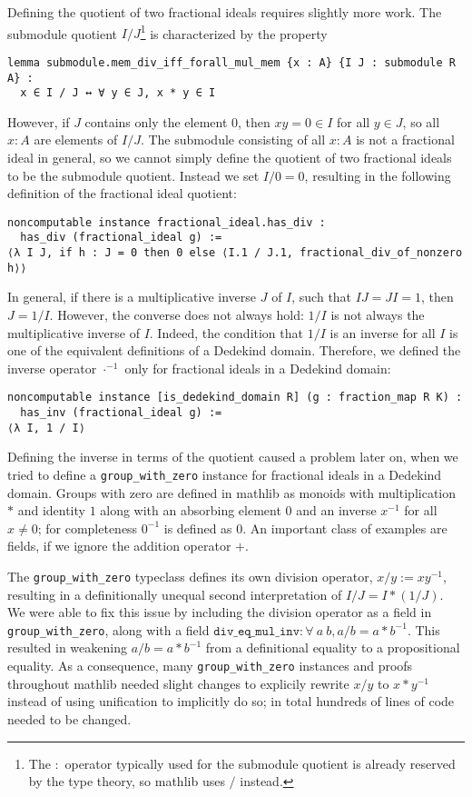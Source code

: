 \documentclass[a4paper,USenglish,cleveref, autoref, thm-restate]{lipics-v2021}
\newcommand{\lean}[1]{\texttt{#1}\xspace} %
\newcommand{\mathlib}{\textsf{mathlib}\xspace}
\begin{document}
Defining the quotient of two fractional ideals requires slightly more work.
The submodule quotient $I / J$\footnote{The $:$ operator typically used for the submodule quotient is already reserved by the type theory, so \mathlib uses $/$ instead.} is characterized by the property
\begin{lstlisting}
lemma submodule.mem_div_iff_forall_mul_mem {x : A} {I J : submodule R A} :
  x ∈ I / J ↔ ∀ y ∈ J, x * y ∈ I
\end{lstlisting}
However, if $J$ contains only the element $0$,
then $xy = 0 \in I$ for all $y \in J$, so all $x : A$ are elements of $I / J$.
The submodule consisting of all $x : A$ is not a fractional ideal in general,
so we cannot simply define the quotient of two fractional ideals to be the submodule quotient.
Instead we set $I / 0 = 0$, resulting in the following definition of the fractional ideal quotient:
\begin{lstlisting}
noncomputable instance fractional_ideal.has_div :
  has_div (fractional_ideal g) :=
⟨λ I J, if h : J = 0 then 0 else ⟨I.1 / J.1, fractional_div_of_nonzero h⟩⟩
\end{lstlisting}

In general, if there is a multiplicative inverse $J$ of $I$, such that $I J = J I = 1$, then $J = 1 / I$.
However, the converse does not always hold: $1 / I$ is not always the multiplicative inverse of $I$.
Indeed, the condition that $1 / I$ is an inverse for all $I$ is one of the equivalent definitions of a Dedekind domain.
Therefore, we defined the inverse operator $\cdot^{-1}$ only for fractional ideals in a Dedekind domain:
\begin{lstlisting}
noncomputable instance [is_dedekind_domain R] (g : fraction_map R K) :
  has_inv (fractional_ideal g) :=
⟨λ I, 1 / I⟩
\end{lstlisting}

Defining the inverse in terms of the quotient caused a problem later on, when we tried to define a \lean{group\_with\_zero} instance for fractional ideals in a Dedekind domain.
Groups with zero are defined in \mathlib as monoids with multiplication $*$ and identity $1$ along with an absorbing element $0$ and an inverse $x^{-1}$ for all $x \ne 0$; for completeness $0^{-1}$ is defined as $0$.
An important class of examples are fields, if we ignore the addition operator $+$.

The \lean{group\_with\_zero} typeclass defines its own division operator, $x / y := x y^{-1}$,
resulting in a definitionally unequal second interpretation of $I / J = I * (1 / J)$.
We were able to fix this issue by including the division operator as a field in \lean{group\_with\_zero},
along with a field $\lean{div\_eq\_mul\_inv} : \forall\ a\ b, a / b = a * b^{-1}$.
This resulted in weakening $a / b = a * b^{-1}$ from a definitional equality to a propositional equality.
As a consequence, many \lean{group\_with\_zero} instances and proofs throughout \mathlib needed slight changes to explicily rewrite $x / y$ to $x * y^{-1}$ instead of using unification to implicitly do so; in total hundreds of lines of code needed to be changed.
\end{document}

